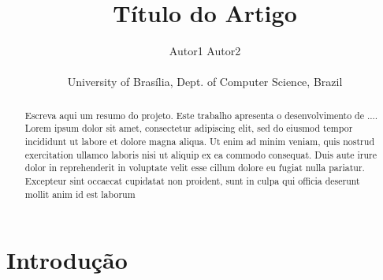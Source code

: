 \documentclass[a4paper]{sbgames}
\begin{document}
\title{Título do Artigo}



 \author{ Autor1 
         \hspace{28pt} Autor2 \\
         \vspace{0pt} \\
         {University of Brasília, Dept. of Computer Science, Brazil} }
        





\maketitle

\begin{abstract}
Escreva aqui um resumo do projeto.
Este trabalho apresenta o desenvolvimento de ....
Lorem ipsum dolor sit amet, consectetur adipiscing elit, sed do eiusmod tempor incididunt ut labore et dolore magna aliqua. Ut enim ad minim veniam, quis nostrud exercitation ullamco laboris nisi ut aliquip ex ea commodo consequat. Duis aute irure dolor in reprehenderit in voluptate velit esse cillum dolore eu fugiat nulla pariatur. Excepteur sint occaecat cupidatat non proident, sunt in culpa qui officia deserunt mollit anim id est laborum

\end{abstract}



\section{Introdução}
\label{sec:introducao}
\end{document}
